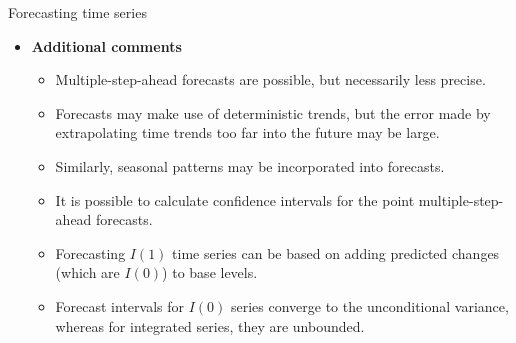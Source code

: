 \documentclass{beamer}
\begin{document}
\begin{frame}{Forecasting time series}
\begin{itemize}
\item \textbf{Additional comments}
\begin{itemize}
\item Multiple-step-ahead forecasts are possible, but necessarily less precise.
\item Forecasts may make use of deterministic trends, but the error made  by extrapolating time trends too far into the future may be large.
\item Similarly, seasonal patterns may be incorporated into forecasts.
\item It is possible to calculate confidence intervals for the point multiple-step-ahead forecasts.  
\item Forecasting $I(1)$ time series can be based on adding predicted changes (which are $I(0)$) to base levels. 
\item Forecast intervals for $I(0)$ series converge to the unconditional variance, whereas for integrated series, they are unbounded.
\end{itemize}
\end{itemize}
\end{frame}
\end{document}
